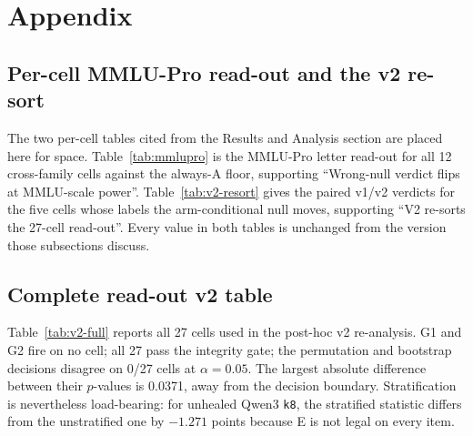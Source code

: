 \section{Appendix}




\subsection{Per-cell MMLU-Pro read-out and the v2 re-sort}
\label{app:mmlupro-and-resort}

The two per-cell tables cited from the Results and Analysis section are placed here
for space. Table~\ref{tab:mmlupro} is the MMLU-Pro letter read-out for all 12
cross-family cells against the always-A floor, supporting
``Wrong-null verdict flips at MMLU-scale power''. Table~\ref{tab:v2-resort} gives the
paired v1/v2 verdicts for the five cells whose labels the arm-conditional null moves,
supporting ``V2 re-sorts the 27-cell read-out''. Every value in both tables is
unchanged from the version those subsections discuss.



\FloatBarrier



\FloatBarrier

\subsection{Complete read-out v2 table}

Table~\ref{tab:v2-full} reports all 27 cells used in the post-hoc v2 re-analysis. G1 and G2 fire on no cell; all 27 pass the integrity gate; the permutation and bootstrap decisions disagree on 0/27 cells at $\alpha=0.05$. The largest absolute difference between their $p$-values is 0.0371, away from the decision boundary. Stratification is nevertheless load-bearing: for unhealed Qwen3 \texttt{k8}, the stratified statistic differs from the unstratified one by $-1.271$ points because E is not legal on every item.

